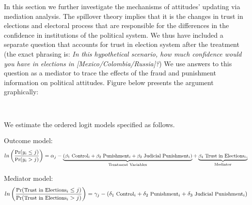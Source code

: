 \documentclass[11pt, ngerman,english,a4]{article}
\begin{document}
\onehalfspacing
In this section we further investigate the mechanisms of attitudes' updating via mediation analysis. The spillover theory implies that it is the changes in trust in elections and electoral process that are responsible for the differences in the confidence in institutions of the political system. We thus have included a separate question that accounts for trust in election system after the treatment (the exact phrasing is: \textit{In this hypothetical scenario, how much confidence would you have in elections in [Mexico/Colombia/Russia]?}) We use answers to this question as a mediator to trace the effects of the fraud and punishment information on political attitudes. Figure below presents the argument graphically:

\\

\begin{figure}[H]
    \centering
    \end{figure}

\noindent We estimate the ordered logit models specified as follows.

\noindent Outcome model:
\begin{equation}
\small
ln \left (\frac{\text{Pr}(y_i \leq j)}{\text{Pr}(y_i > j)} \right) = \alpha_j - \underbrace{
({\beta_1} {\text{ Control}_i} + 
\beta_2 {\text{ Punishment}_i} + 
\beta_3 {\text{ Judicial Punishment}_i})
}_{\text{Treatment Variables}} +
\underbrace{\beta_4 \text{ Trust in Elections}_i,}_{
\text{Mediator}}
\end{equation}

\noindent Mediator model:
\begin{equation}
\small
ln \left (\frac{\text{Pr}(\text{Trust in Elections}_i \leq j)}{\text{Pr}(\text{Trust in Elections}_i > j)} \right) =\gamma_j - 
({\delta_1} {\text{ Control}_i} + 
\delta_2 {\text{ Punishment}_i} + 
\delta_3 {\text{ Judicial Punishment}_i})
\end{equation}
\end{document}
